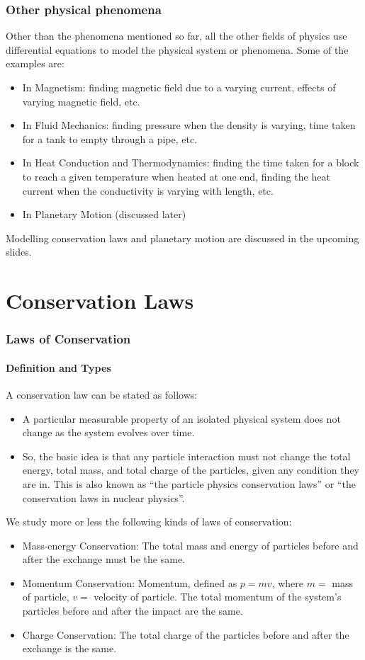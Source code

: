\documentclass[10pt]{beamer}
\begin{document}
\begin{frame}
    \frametitle{Other physical phenomena}
    Other than the phenomena mentioned so far, all the other fields of physics use differential equations to model the physical system or phenomena. Some of the examples are:
    \begin{itemize}
        \item In Magnetism: finding magnetic field due to a varying current, effects of varying magnetic field, etc.
        \item In Fluid Mechanics: finding pressure when the density is varying, time taken for a tank to empty through a pipe, etc.
        \item In Heat Conduction and Thermodynamics: finding the time taken for a block to reach a given temperature when heated at one end, finding the heat current when the conductivity is varying with length, etc.
        \item In Planetary Motion (discussed later)
    \end{itemize}
    Modelling conservation laws and planetary motion are discussed in the upcoming slides.
\end{frame}

\section{Conservation Laws}

\begin{frame}
    \fontsize{9pt}{10pt}\selectfont
    \frametitle{Laws of Conservation}
    \framesubtitle{Definition and Types}
    A conservation law can be stated as follows:
    \begin{itemize}
        \item A particular measurable property of an isolated physical system does not change as the system evolves over time.
        \item So, the basic idea is that any particle interaction must not change the total energy, total mass, and total charge of the particles, given any condition they are in. This is also known as “the particle physics conservation laws” or “the conservation laws in nuclear physics”.
    \end{itemize}
    We study more or less the following kinds of laws of conservation:
    \begin{itemize}
        \item Mass-energy Conservation: The total mass and energy of particles before and after the exchange must be the same.
        \item Momentum Conservation: Momentum, defined as $p = mv$, where $m =$ mass of particle, $v =$ velocity of particle. The total momentum of the system’s particles before and after the impact are the same.
        \item Charge Conservation: The total charge of the particles before and after the exchange is the same.
    \end{itemize}
\end{frame}
\end{document}
